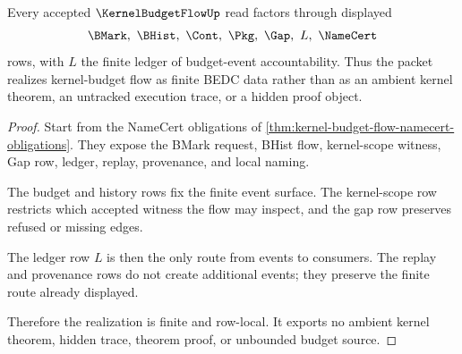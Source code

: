\begin{theorem}
\label{thm:kernel-budget-flow-finite-realization}
Every accepted $\KernelBudgetFlowUp$ read factors through displayed
$$
\BMark,\ \BHist,\ \Cont,\ \Pkg,\ \Gap,\ L,\ \NameCert
$$
rows, with $L$ the finite ledger of budget-event accountability. Thus the packet realizes kernel-budget flow as finite BEDC data rather than as an ambient kernel theorem, an untracked execution trace, or a hidden proof object.
\end{theorem}
\begin{proof}
Start from the NameCert obligations of \autoref{thm:kernel-budget-flow-namecert-obligations}. They expose the BMark request, BHist flow, kernel-scope witness, Gap row, ledger, replay, provenance, and local naming.

The budget and history rows fix the finite event surface. The kernel-scope row restricts which accepted witness the flow may inspect, and the gap row preserves refused or missing edges.

The ledger row $L$ is then the only route from events to consumers. The replay and provenance rows do not create additional events; they preserve the finite route already displayed.

Therefore the realization is finite and row-local. It exports no ambient kernel theorem, hidden trace, theorem proof, or unbounded budget source.
\end{proof}




